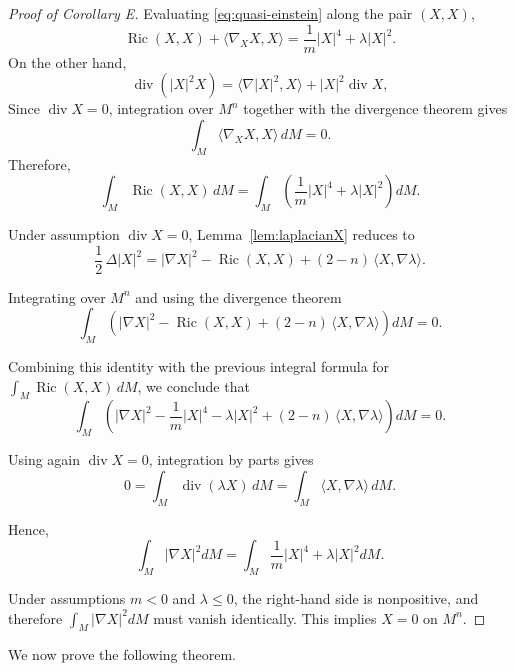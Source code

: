 \documentclass[a4paper, 12pt]{amsart}
\theoremstyle{definition}
\numberwithin{figure}{section}
\begin{document}
\begin{proof}[Proof of Corollary E]

Evaluating \eqref{eq:quasi-einstein} along the pair \((X,X)\),
$$
\operatorname{Ric}(X,X) + \langle \nabla_X X, X \rangle
= \frac{1}{m}\lvert X\rvert^4 + \lambda \lvert X\rvert^2 .
$$
On the other hand,
$$
\operatorname{div}(|X|^2 X)
= \langle \nabla |X|^2, X \rangle + |X|^2 \operatorname{div} X,
$$
Since \(\operatorname{div}X=0\), integration over \(M^n\) together with the divergence theorem gives
$$
\int_M \langle \nabla_X X, X \rangle \, dM = 0 .
$$
Therefore,
$$
\int_M \operatorname{Ric}(X,X) \, dM
= \int_M\left(\frac{1}{m}\lvert X\rvert^4 + \lambda \lvert X\rvert^2\right) dM .
$$

Under assumption \(\operatorname{div}X=0\), Lemma~\ref{lem:laplacianX} reduces to
$$
\frac{1}{2}\,\Delta |X|^{2}
= |\nabla X|^{2}
- \operatorname{Ric}(X,X)
+ (2-n)\,\langle X,\nabla \lambda\rangle .
$$

Integrating over $M^n$ and using the divergence theorem
$$
\int_M \left(
|\nabla X|^2
- \operatorname{Ric}(X,X)
+ (2-n)\,\langle X,\nabla \lambda\rangle
\right) dM = 0 .
$$

Combining this identity with the previous integral formula for
$\int_M \operatorname{Ric}(X,X)\, dM$, we conclude that
$$
\int_M \left(
|\nabla X|^2
- \frac{1}{m}\lvert X\rvert^4
- \lambda \lvert X\rvert^2
+ (2-n)\,\langle X,\nabla \lambda\rangle
\right) dM = 0 .
$$

Using again \(\operatorname{div}X=0\), integration by parts gives
$$
0 = \int_M \operatorname{div}(\lambda X)\, dM
= \int_M \langle X,\nabla \lambda \rangle \, dM .
$$

Hence,
$$
\int_M
|\nabla X|^2 dM=\int_M
\frac{1}{m}\lvert X\rvert^4
 +\lambda \lvert X\rvert^2
 dM  .
$$

Under assumptions $m<0$ and $\lambda \le 0$, the right-hand side is nonpositive,
and therefore $\int_M
|\nabla X|^2dM$  must vanish identically. This implies $X =0$ on $M^n$.
\end{proof}

We now prove the following theorem.
\end{document}
